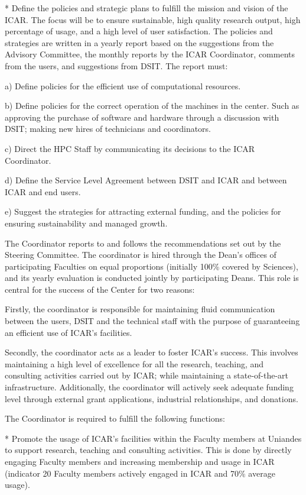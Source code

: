 \documentclass{article}
\begin{document}
* Define the policies and strategic plans to fulfill the mission and vision of the ICAR. The focus will be to ensure sustainable, high quality research output, high percentage of usage, and a high level of user satisfaction. The policies and strategies are written in a yearly report based on the suggestions from the Advisory Committee, the monthly reports by the ICAR Coordinator, comments from the users, and suggestions from DSIT. The report must:

a) Define policies for the efficient use of computational resources.

b) Define policies for the correct operation of the machines in the center. Such as approving the purchase of software and hardware through a discussion with DSIT; making new hires of technicians and coordinators.

c) Direct the HPC Staff by communicating its decisions to the ICAR Coordinator.

d) Define the Service Level Agreement between DSIT and ICAR and between ICAR and end users.

e) Suggest the strategies for attracting external funding, and the policies for ensuring sustainability and managed growth.

The Coordinator reports to and follows the recommendations set out by the Steering Committee. The coordinator is hired through the Dean’s offices of participating Faculties on equal proportions (initially 100\% covered by Sciences), and its yearly evaluation is conducted jointly by participating Deans. This role is central for the success of the Center for two reasons:

Firstly, the coordinator is responsible for maintaining fluid communication between the users, DSIT and the technical staff with the purpose of guaranteeing an efficient use of ICAR’s facilities.

Secondly, the coordinator acts as a leader to foster ICAR’s success. This involves maintaining a high level of excellence for all the research, teaching, and consulting activities carried out by ICAR; while maintaining a state-of-the-art infrastructure. Additionally, the coordinator will actively seek adequate funding level through external grant applications, industrial relationships, and donations.

The Coordinator is required to fulfill the following functions:

* Promote the usage of ICAR’s facilities within the Faculty members at Uniandes to support research, teaching and consulting activities. This is done by directly engaging Faculty members and increasing membership and usage in ICAR (indicator 20 Faculty members actively engaged in ICAR and 70\% average usage).
\end{document}

